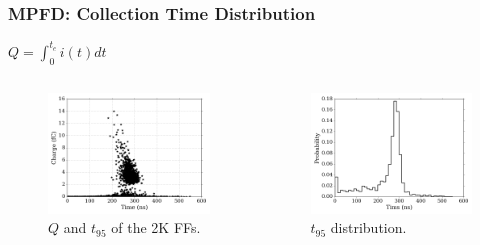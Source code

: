 \documentclass[fleqn]{beamer}
\begin{document}
\begin{frame}
 \frametitle{MPFD: Collection Time Distribution}
 \centering
$Q = \int_0^{t_e} i(t) dt$

 \begin{columns}[c]
 \begin{column}{.5\textwidth}
  \begin{figure}
   \centering
   \includegraphics[width = \textwidth]{micro_charge_time}
   \caption{$Q$ and $t_{95}$ of the 2K FFs.}
  \end{figure}
 \end{column}

  \begin{column}{.5\textwidth}
   \begin{figure}
    \centering
    \includegraphics[width = \textwidth]{micro_t95_dist}
    \caption{$t_{95}$ distribution.}
   \end{figure}
  \end{column}
 \end{columns}
\end{frame}
\end{document}
